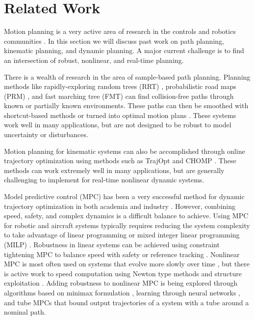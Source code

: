 \section{Related Work \label{sec:relatedwork}}
Motion planning is a very active area of research in the controls and robotics communities \cite{Hoy2015}.  In this section we will discuss past work on path planning, kinematic planning, and dynamic planning.  A major current challenge is to find an intersection of robust, nonlinear, and real-time planning. 

There is a wealth of research in the area of sample-based path planning.  Planning methods like rapidly-exploring random trees (RRT) \cite{Kuffner2000}, probabilistic road maps (PRM) \cite{Kavraki1996}, and fast marching tree (FMT) \cite{Janson2015} can find collision-free paths through known or partially known environments.  These paths can then be smoothed with shortcut-based methods or turned into optimal motion plans \cite{Richter2016, Karaman2011, Kobilarov2012}.  These systems work well in many applications, but are not designed to be robust to model uncertainty or disturbances.

Motion planning for kinematic systems can also be accomplished through online trajectory optimization using methods such as TrajOpt \cite{Schulman2013} and CHOMP \cite{Ratliff2009}. These methods can work extremely well in many applications, but are generally challenging to implement for real-time nonlinear dynamic systems.

Model predictive control (MPC) has been a very successful method for dynamic trajectory optimization in both academia and industry \cite{Qin2003}.  However, combining speed, safety, and complex dynamics is a difficult balance to achieve. Using MPC for robotic and aircraft systems typically requires reducing the system complexity to take advantage of linear programming or mixed integer linear programming (MILP) \cite{Alexis2016, Bellingham2002, Vitus2008, Zeilinger2011, Richter2012}. Robustness in linear systems can be achieved using constraint tightening MPC to balance speed with safety \cite{Kuwata2007, Richards2006} or reference tracking \cite{DiCairano2016}. Nonlinear MPC is most often used on systems that evolve more slowly over time \cite{Diehl2002, Schildbach2016}, but there is active work to speed computation using Newton type methods and structure exploitation \cite{Diehl2009,Findeisen2007, Grune2011, Quirynen2015, Gupta2015, Neunert2016, Torrisi2016}. Adding robustness to nonlinear MPC is being explored through algorithms based on minimax formulation \cite{Lofberg2003, Kumar2014}, learning through neural networks \cite{Yan2014}, and tube MPCs \cite{Mayne2011, Cannon2011, Kumar2014, Gao2014} that bound output trajectories of a system with a tube around a nominal path.

